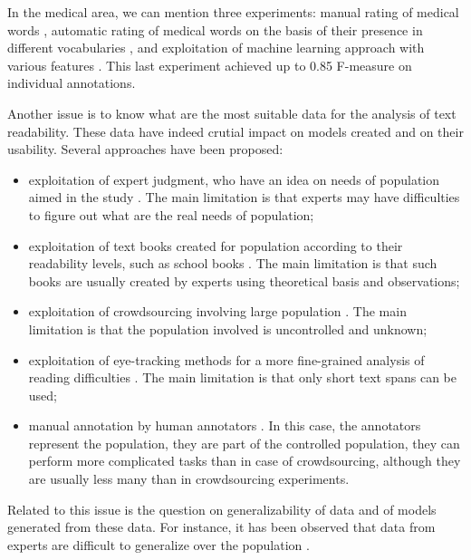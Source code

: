 In the medical area, we can mention three experiments: manual rating
of medical words \citep{Zheng-AMIA2002}, automatic rating of medical
words on the basis of their presence in different vocabularies
\citep{Borst-MIE2008}, and exploitation of machine learning approach
with various features \citep{Grabar-PITR2014}. This last experiment
achieved up to 0.85 F-measure on individual annotations.

Another issue is to know what are the most suitable data for the
analysis of text readability. These data have indeed crutial impact on
models created and on their usability.  Several approaches have been
proposed:
\begin{itemize}
\item exploitation of expert judgment, who have an idea on needs of
  population aimed in the study \citep{DeClerc-NLE2014}. The main
  limitation is that experts may have difficulties to figure out what
  are the real needs of population;
\item exploitation of text books created for population according to
  their readability levels, such as school books
  \citep{Gala-ELEX2013}. The main limitation is that such books are
  usually created by experts using theoretical basis and observations;
\item exploitation of crowdsourcing involving large population
  \citep{DeClerc-NLE2014}.  The main limitation is that the
  population involved is uncontrolled and unknown;
\item exploitation of eye-tracking methods for a more fine-grained
  analysis of reading difficulties
  \citep{Yaneva-CCA2015,Grabar-ICHI2018}.  The main limitation is that
  only short text spans can be used;
\item manual annotation by human annotators
  \citep{Grabar-LREC2016t}. In this case, the annotators represent the
  population, they are part of the controlled population, they can
  perform more complicated tasks than in case of crowdsourcing,
  although they are usually less many than in crowdsourcing
  experiments.
\end{itemize}
Related to this issue is the question on generalizability of data and
of models generated from these data.  For instance, it has been
observed that data from experts are difficult to generalize over the
population \citep{DeClerc-NLE2014}.

